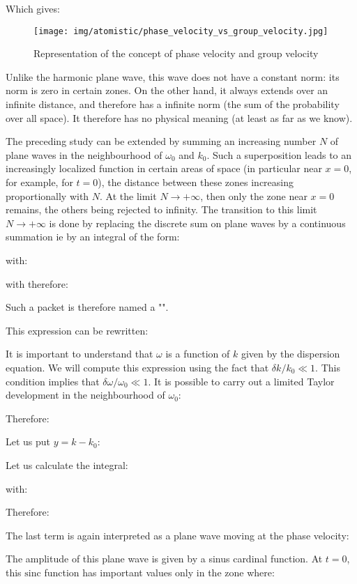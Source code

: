 	Which gives:
	\begin{figure}[H]
		\centering
		\texttt{[image: img/atomistic/phase\_velocity\_vs\_group\_velocity.jpg]}	
		\caption{Representation of the concept of phase velocity and group velocity}
	\end{figure}
	Unlike the harmonic plane wave, this wave does not have a constant norm: its norm is zero in certain zones. On the other hand, it always extends over an infinite distance, and therefore has a infinite norm (the sum of the probability over all space). It therefore has no physical meaning (at least as far as we know).

	The preceding study can be extended by summing an increasing number $N$ of plane waves in the neighbourhood of $\omega_0$ and $k_0$. Such a superposition leads to an increasingly localized function in certain areas of space (in particular near $x=0$, for example, for $t=0$), the distance between these zones increasing proportionally with $N$. At the limit $N\rightarrow +\infty$, then only the zone near $x=0$ remains, the others being rejected to infinity. The transition to this limit  $N\rightarrow +\infty$ is done by replacing the discrete sum on plane waves by a continuous summation ie by an integral of the form:
	
	with:
	
	with therefore:
	
	Such a packet is therefore named a "".

	This expression can be rewritten:
	
	It is important to understand that $\omega$ is a function of $k$ given by the dispersion equation. We will compute this expression using the fact that $\delta k/k_0\ll 1$. This condition implies that $\delta \omega/\omega_0\ll 1$. It is possible to carry out a limited Taylor development in the neighbourhood of $\omega_0$:
	
	Therefore:
	
	Let us put $y=k-k_0$:
	
	Let us calculate the integral:
	
	with:
	
	Therefore:
	
	The last term is again interpreted as a plane wave moving at the phase velocity:
	
	The amplitude of this plane wave is given by a sinus cardinal function. At $t=0$, this $\mathrm{sinc}$ function has important values only in the zone where:
	
